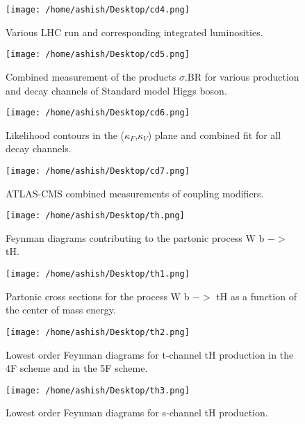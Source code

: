 \documentclass[final,3p]{CSP}
\begin{document}
\begin{figure}
  \centering
   \texttt{[image: /home/ashish/Desktop/cd4.png]}
  \caption{Various LHC run and corresponding integrated luminosities.}
   \label{figure 16}
\end{figure}


\begin{figure}
  \centering
   \texttt{[image: /home/ashish/Desktop/cd5.png]}
  \caption{Combined measurement of the products $\sigma$.BR for various production and decay channels of Standard model Higgs boson.}
   \label{figure 17}
\end{figure}

\begin{figure}
  \centering
   \texttt{[image: /home/ashish/Desktop/cd6.png]}
  \caption{Likelihood contours in the ($\kappa_F$,$\kappa_V$) plane and combined fit for all decay channels.}
   \label{figure 18}
\end{figure}


\begin{figure}
  \centering
   \texttt{[image: /home/ashish/Desktop/cd7.png]}
  \caption{ATLAS-CMS combined measurements of coupling modifiers.}
   \label{figure 19}
\end{figure}

\begin{figure}
  \centering
   \texttt{[image: /home/ashish/Desktop/th.png]}
  \caption{Feynman diagrams contributing to the partonic process W b $->$ tH.}
   \label{figure 20}
\end{figure}

\begin{figure}
  \centering
   \texttt{[image: /home/ashish/Desktop/th1.png]}
  \caption{Partonic cross sections for the process W b $->$ tH as a function of the center of mass
energy.}
   \label{figure 21}
\end{figure}

\begin{figure}
  \centering
   \texttt{[image: /home/ashish/Desktop/th2.png]}
  \caption{Lowest order Feynman diagrams for t-channel tH production in the 4F scheme and in the 5F scheme.}
   \label{figure 22}
\end{figure}

\begin{figure}
  \centering
   \texttt{[image: /home/ashish/Desktop/th3.png]}
  \caption{Lowest order Feynman diagrams for s-channel tH production.}
   \label{figure 22}
\end{figure}
\end{document}
